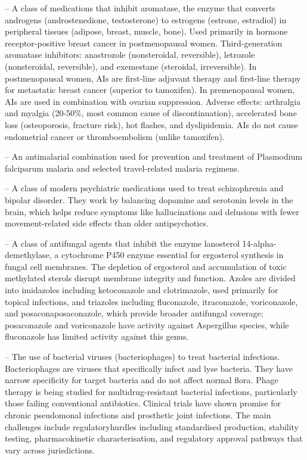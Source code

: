 -- A class of medications that inhibit aromatase, the enzyme that converts androgens (androstenedione, testosterone) to estrogens (estrone, estradiol) in peripheral tissues (adipose, breast, muscle, bone). Used primarily in hormone receptor-positive breast cancer in postmenopausal women. Third-generation aromatase inhibitors: anastrozole (nonsteroidal, reversible), letrozole (nonsteroidal, reversible), and exemestane (steroidal, irreversible). In postmenopausal women, AIs are first-line adjuvant therapy and first-line therapy for metastatic breast cancer (superior to tamoxifen). In premenopausal women, AIs are used in combination with ovarian suppression. Adverse effects: arthralgia and myalgia (20-50\%, most common cause of discontinuation), accelerated bone loss (osteoporosis, fracture risk), hot flashes, and dyslipidemia. AIs do not cause endometrial cancer or thromboembolism (unlike tamoxifen).

-- An antimalarial combination used for prevention and treatment of Plasmodium falciparum malaria and selected travel-related malaria regimens.

-- A class of modern psychiatric medications used to treat schizophrenia and bipolar disorder. They work by balancing dopamine and serotonin levels in the brain, which helps reduce symptoms like hallucinations and delusions with fewer movement-related side effects than older antipsychotics.

-- A class of antifungal agents that inhibit the enzyme lanosterol 14-alpha-demethylase, a cytochrome P450 enzyme essential for ergosterol synthesis in fungal cell membranes. The depletion of ergosterol and accumulation of toxic methylated sterols disrupt membrane integrity and function. Azoles are divided into imidazoles including ketoconazole and clotrimazole, used primarily for topical infections, and triazoles including fluconazole, itraconazole, voriconazole, and posaconaposaconazole, which provide broader antifungal coverage; posaconazole and voriconazole have activity against Aspergillus species, while fluconazole has limited activity against this genus.

-- The use of bacterial viruses (bacteriophages) to treat bacterial infections. Bacteriophages are viruses that specifically infect and lyse bacteria. They have narrow specificity for target bacteria and do not affect normal flora. Phage therapy is being studied for multidrug-resistant bacterial infections, particularly those failing conventional antibiotics. Clinical trials have shown promise for chronic pseudomonal infections and prosthetic joint infections. The main challenges include regulatoryhurdles including standardised production, stability testing, pharmacokinetic characterisation, and regulatory approval pathways that vary across jurisdictions.

